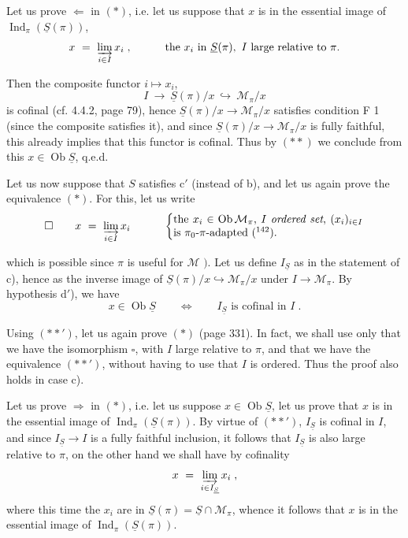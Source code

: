 \documentclass[11pt]{article}
\newcommand{\printedpage}[1]{\marginpar{\footnotesize p.~#1}}
\newcommand{\msp}[1]{\marginpar{\footnotesize [#1]}}
\DeclareMathOperator{\Ob}{Ob}
\DeclareMathOperator{\Ind}{Ind}
\begin{document}
Let us prove $\Longleftarrow$ in $(*)$, i.e. let us suppose that $x$ is in the essential image of $\Ind_\pi(\underline{S}(\pi))$,
\printedpage{126}
\msp{page 333}
\[
x \ = \ \varinjlim_{i\in I} x_i \; , \qquad\quad \text{the } x_i \text{ in } \underline{S}(\pi),\ I \text{ large relative to } \pi.
\]

Then the composite functor $i \longmapsto x_i$,
\[
I \ \longrightarrow \ \underline{S}(\pi)/x \ \hookrightarrow \ \mathcal{M}_\pi/x
\]
is cofinal (cf. 4.4.2, page 79), hence $\underline{S}(\pi)/x \longrightarrow \mathcal{M}_\pi/x$ satisfies condition F 1 (since the composite satisfies it), and since $\underline{S}(\pi)/x \longrightarrow \mathcal{M}_\pi/x$ is fully faithful, this already implies that this functor is cofinal. Thus by $(**)$ we conclude from this $x \in \Ob\underline{S}$, q.e.d.

Let us now suppose that $S$ satisfies c$'$ (instead of b), and let us again prove the equivalence $(*)$. For this, let us write
\[
\square \qquad x \ = \ \varinjlim_{i\in I} x_i \qquad\quad
\left\{
\begin{minipage}[c]{0.5\textwidth}
the $x_i \in \Ob\mathcal{M}_\pi$, $I$ \textit{ordered set}, $(x_i)_{i\in I}$ is $\pi_0$-$\pi$-adapted (\footnotemark[142]).
\end{minipage}
\right.
\]

which is possible since $\pi$ is useful for $\mathcal{M}$ $\Bigg)$. Let us define $I_{\underline{S}}$ as in the statement of c), hence as the inverse image of $\underline{S}(\pi)/x \hookrightarrow \mathcal{M}_\pi/x$ under $I \longrightarrow \mathcal{M}_\pi$. By hypothesis d$'$), we have
\[
x \in \Ob\underline{S} \qquad \Longleftrightarrow \qquad I_{\underline{S}} \text{ is cofinal in } I \; . \tag*{$(**')$}
\]

Using $(**')$, let us again prove $(*)$ (page 331). In fact, we shall use only that we have
\msp{page 334}
the isomorphism $\square$, with $I$ large relative to $\pi$, and that we have the equivalence $(**')$, without having to use that $I$ is ordered. Thus the proof also holds in case c).

Let us prove $\Longrightarrow$ in $(*)$, i.e. let us suppose $x \in \Ob\underline{S}$, let us prove that $x$ is in the essential image of $\Ind_\pi(\underline{S}(\pi))$. By virtue of $(**')$, $I_{\underline{S}}$ is cofinal in $I$, and since $I_{\underline{S}} \longrightarrow I$ is a fully faithful inclusion, it follows that $I_{\underline{S}}$ is also large relative to $\pi$, on the other hand we shall have by cofinality
\[
x \ = \ \varinjlim_{i\in I_{\underline{S}}} x_i \; ,
\]
where this time the $x_i$ are in $\underline{S}(\pi) = \underline{S}\cap\mathcal{M}_\pi$, whence it follows that $x$ is in the essential image of $\Ind_\pi(\underline{S}(\pi))$.
\end{document}
